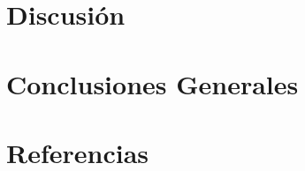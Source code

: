 \documentclass[a4paper,11pt] {article}
\begin{document}
\section*{Discusión}

\section*{Conclusiones Generales}

%
%
%

\section*{Referencias}
\end{document}
